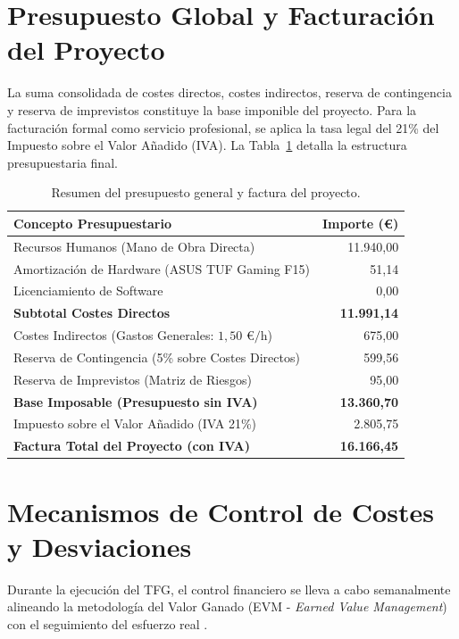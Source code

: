 \documentclass[12pt, a4paper, twoside]{report}
\begin{document}
\section{Presupuesto Global y Facturación del Proyecto}
La suma consolidada de costes directos, costes indirectos, reserva de contingencia y reserva de imprevistos constituye la base imponible del proyecto. Para la facturación formal como servicio profesional, se aplica la tasa legal del 21\% del Impuesto sobre el Valor Añadido (IVA). La Tabla~\ref{tab:presupuesto_consolidado} detalla la estructura presupuestaria final.

\begin{table}[H]
\centering
\caption{Resumen del presupuesto general y factura del proyecto.}
\label{tab:presupuesto_consolidado}
\small
\renewcommand{\arraystretch}{0.85}
\setlength{\tabcolsep}{4pt}
\begin{tabularx}{0.85\textwidth}{@{} X r @{}}
\toprule
\textbf{Concepto Presupuestario} & \textbf{Importe (€)} \\ \midrule
Recursos Humanos (Mano de Obra Directa) & 11.940,00 \\
Amortización de Hardware (ASUS TUF Gaming F15) & 51,14 \\
Licenciamiento de Software & 0,00 \\ \midrule
\textbf{Subtotal Costes Directos} & \textbf{11.991,14} \\ \addlinespace[2pt]
Costes Indirectos (Gastos Generales: $1,50 \text{ €/h}$) & 675,00 \\
Reserva de Contingencia (5\% sobre Costes Directos) & 599,56 \\
Reserva de Imprevistos (Matriz de Riesgos) & 95,00 \\ \midrule
\textbf{Base Imposable (Presupuesto sin IVA)} & \textbf{13.360,70} \\ \addlinespace[2pt]
Impuesto sobre el Valor Añadido (IVA 21\%) & 2.805,75 \\ \midrule
\textbf{Factura Total del Proyecto (con IVA)} & \textbf{16.166,45} \\ \bottomrule
\end{tabularx}
\end{table}

\section{Mecanismos de Control de Costes y Desviaciones}
Durante la ejecución del TFG, el control financiero se lleva a cabo semanalmente alineando la metodología del Valor Ganado (EVM - \textit{Earned Value Management}) con el seguimiento del esfuerzo real \cite{fib_costos}.
\end{document}
